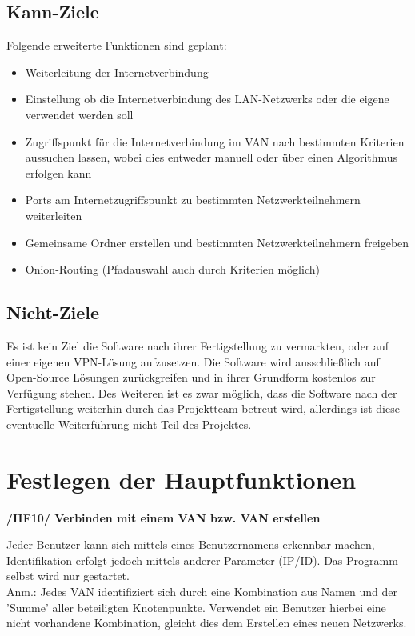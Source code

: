 \documentclass[a4paper,12pt]{scrreprt}
\begin{document}
		\subsection{Kann-Ziele}
			Folgende erweiterte Funktionen sind geplant:
			\begin{itemize}
			\item Weiterleitung der Internetverbindung
			\item Einstellung ob die Internetverbindung des LAN-Netzwerks oder die eigene verwendet werden soll
			\item Zugriffspunkt für die Internetverbindung im VAN nach bestimmten Kriterien aussuchen lassen, wobei dies entweder manuell oder über einen Algorithmus erfolgen kann
			
			\item Ports am Internetzugriffspunkt zu bestimmten Netzwerkteilnehmern weiterleiten
			\item Gemeinsame Ordner erstellen und bestimmten Netzwerkteilnehmern freigeben
			
			\item Onion-Routing (Pfadauswahl auch durch Kriterien möglich)
			
			\end{itemize}
			
		\subsection{Nicht-Ziele}
			Es ist kein Ziel die Software nach ihrer Fertigstellung zu vermarkten, oder auf einer eigenen VPN-Lösung aufzusetzen. Die Software wird ausschließlich auf Open-Source Lösungen zurückgreifen und in ihrer Grundform kostenlos zur Verfügung stehen. Des Weiteren ist es zwar möglich, dass die Software nach der Fertigstellung weiterhin durch das Projektteam betreut wird, allerdings ist diese eventuelle Weiterführung nicht Teil des Projektes.
			
	\section{Festlegen der Hauptfunktionen}
		\textbf{/HF10/ Verbinden mit einem VAN bzw. VAN erstellen}
		
		Jeder Benutzer kann sich mittels eines Benutzernamens erkennbar machen, Identifikation erfolgt jedoch mittels anderer Parameter (IP/ID). Das Programm selbst wird nur gestartet.\\
		Anm.: Jedes VAN identifiziert sich durch eine Kombination aus Namen und der 'Summe' aller beteiligten Knotenpunkte. Verwendet ein Benutzer hierbei eine nicht vorhandene Kombination, gleicht dies dem Erstellen eines neuen Netzwerks. \\
		
\end{document}
